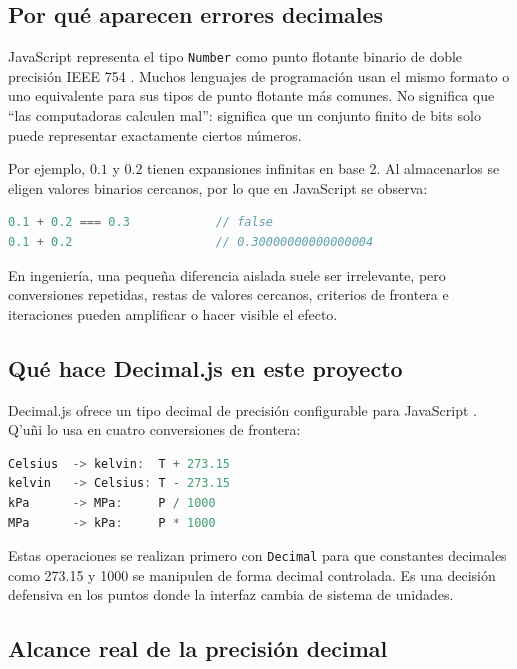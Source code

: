 \documentclass[11pt,a4paper,oneside]{article}
\newcommand{\app}{Q'u\~ni}
\newcommand{\code}[1]{\texttt{#1}}
\begin{document}
\subsection{Por qu\'e aparecen errores decimales}

JavaScript representa el tipo \code{Number} como punto flotante binario de doble precisi\'on IEEE 754 \cite{mdn-number,ieee754}. Muchos lenguajes de programaci\'on usan el mismo formato o uno equivalente para sus tipos de punto flotante m\'as comunes. No significa que ``las computadoras calculen mal'': significa que un conjunto finito de bits solo puede representar exactamente ciertos n\'umeros.

Por ejemplo, $0.1$ y $0.2$ tienen expansiones infinitas en base 2. Al almacenarlos se eligen valores binarios cercanos, por lo que en JavaScript se observa:

\begin{lstlisting}[language=JavaScript]
0.1 + 0.2 === 0.3            // false
0.1 + 0.2                    // 0.30000000000000004
\end{lstlisting}

En ingenier\'ia, una peque\~na diferencia aislada suele ser irrelevante, pero conversiones repetidas, restas de valores cercanos, criterios de frontera e iteraciones pueden amplificar o hacer visible el efecto.

\subsection{Qu\'e hace Decimal.js en este proyecto}

Decimal.js ofrece un tipo decimal de precisi\'on configurable para JavaScript \cite{decimaljs}. \app{} lo usa en cuatro conversiones de frontera:

\begin{lstlisting}[language=JavaScript]
Celsius  -> kelvin:  T + 273.15
kelvin   -> Celsius: T - 273.15
kPa      -> MPa:     P / 1000
MPa      -> kPa:     P * 1000
\end{lstlisting}

Estas operaciones se realizan primero con \code{Decimal} para que constantes decimales como 273.15 y 1000 se manipulen de forma decimal controlada. Es una decisi\'on defensiva en los puntos donde la interfaz cambia de sistema de unidades.

\subsection{Alcance real de la precisi\'on decimal}
\end{document}
